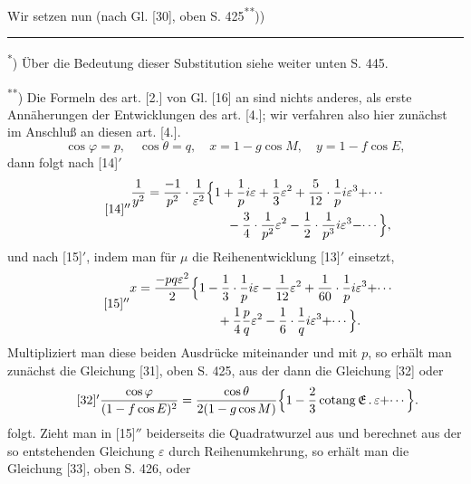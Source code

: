 \indent Wir setzen nun (nach Gl. [30], oben S. 425\textsuperscript{**}))
\par\medskip\noindent\rule{.24\linewidth}{.4pt}\par\smallskip
\noindent\hspace*{\parindent}\textsuperscript{*}) Über die Bedeutung dieser Substitution siehe weiter unten S. 445.
\par\noindent\hspace*{\parindent}\textsuperscript{**}) Die Formeln des art. [2.] von Gl. [16] an sind nichts anderes, als erste Annäherungen der Entwicklungen des art. [4.]; wir verfahren also hier zunächst im Anschluß an diesen art. [4.].
\clearpage{}
\[\cos\varphi=p,\quad\cos\theta=q,\quad x=1-g\cos M,\quad y=1-f\cos E,\]
\noindent dann folgt nach [14]$'$
\begin{equation}\tag*{[14]$''$}
\begin{aligned}
\frac1{y^2}={}&\frac{-1}{p^2}\cdot\frac1{\varepsilon^2}\Bigl\{1+\frac1p i\varepsilon+\frac13\varepsilon^2+\frac5{12}\cdot\frac1p i\varepsilon^3+\cdotp\cdotp\cdotp\\
&\hspace{5em}-\frac34\cdot\frac1{p^2}\varepsilon^2-\frac12\cdot\frac1{p^3}i\varepsilon^3-\cdotp\cdotp\cdotp\Bigr\},
\end{aligned}
\end{equation}
\noindent und nach [15]$'$, indem man für \(\mu\) die Reihenentwicklung [13]$'$ einsetzt,
\begin{equation}\tag*{[15]$''$}
\begin{aligned}
x={}&\frac{-pq\varepsilon^2}{2}\Bigl\{1-\frac13\cdot\frac1p i\varepsilon-\frac1{12}\varepsilon^2+\frac1{60}\cdot\frac1p i\varepsilon^3+\cdotp\cdotp\cdotp\\
&\hspace{5em}+\frac14\frac pq\varepsilon^2-\frac16\cdot\frac1q i\varepsilon^3+\cdotp\cdotp\cdotp\Bigr\}.
\end{aligned}
\end{equation}
\noindent Multipliziert man diese beiden Ausdrücke miteinander und mit \(p\), so erhält man zunächst die Gleichung [31], oben S. 425, aus der dann die Gleichung [32] oder
\begin{equation}\tag*{[32]$'$}
\frac{\cos\varphi}{(1-f\cos E)^2}=\frac{\cos\theta}{2(1-g\cos M)}\Bigl\{1-\frac23\operatorname{cotang}\mathfrak E\,{.}\,\varepsilon+\cdotp\cdotp\cdotp\Bigr\}.
\end{equation}
\noindent folgt. Zieht man in [15]$''$ beiderseits die Quadratwurzel aus und berechnet aus der so entstehenden Gleichung \(\varepsilon\) durch Reihenumkehrung, so erhält man die Gleichung [33], oben S. 426, oder
